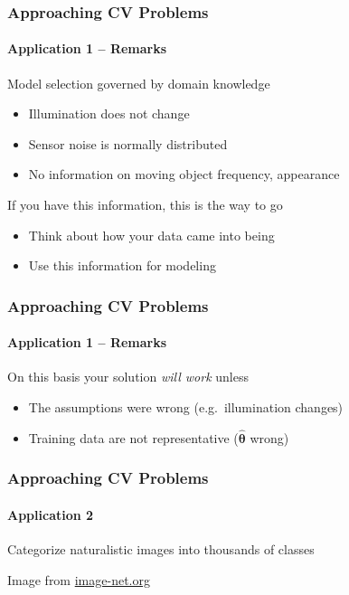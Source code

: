 \documentclass[xetex,professionalfont]{beamer}
\newcommand{\bth}{\boldsymbol{\theta}}
\renewcommand\emph[1]{\textcolor{tuwcvl_inf_red}{#1}}
\begin{document}
\begin{frame}
\frametitle{Approaching CV Problems}
\framesubtitle{Application 1 -- Remarks}

Model selection governed by \emph{domain knowledge}
\begin{itemize}
    \item Illumination does not change
    \item Sensor noise is normally distributed
    \item No information on moving object frequency, appearance
\end{itemize}

\bigskip
If you have this information, \emph{this is the way to go}
\begin{itemize}
    \item Think about how your data came into being
    \item Use this information for modeling
\end{itemize}

\end{frame}


\begin{frame}
\frametitle{Approaching CV Problems}
\framesubtitle{Application 1 -- Remarks}

On this basis your solution \textit{will work} unless
\begin{itemize}
    \item The assumptions were wrong (e.g.\ illumination changes)
    \item Training data are not representative ($\hat{\bth}$ wrong)
\end{itemize}

\end{frame}


\begin{frame}
\frametitle{Approaching CV Problems}
\framesubtitle{Application 2}

Categorize naturalistic images into thousands of classes

\bigskip
\begin{center}
    {\centering Image from \url{image-net.org}}
\end{center}

\end{frame}
\end{document}
